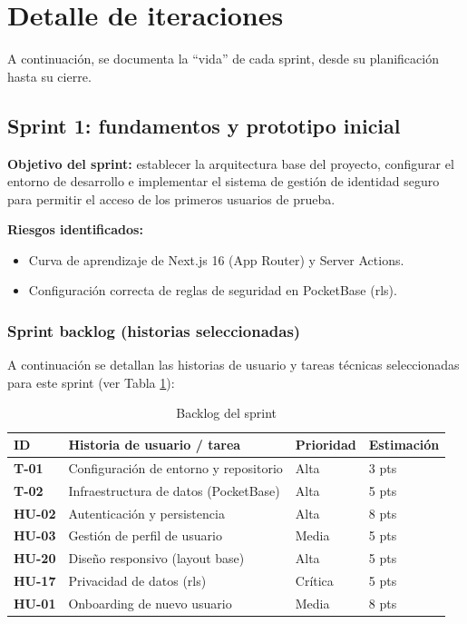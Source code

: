\section{Detalle de iteraciones}

A continuación, se documenta la \enquote{vida} de cada sprint, desde su planificación hasta su cierre.

\subsection{Sprint 1: fundamentos y prototipo inicial}

\textbf{Objetivo del sprint:} establecer la arquitectura base del proyecto, configurar el entorno de desarrollo e implementar el sistema de gestión de identidad seguro para permitir el acceso de los primeros usuarios de prueba.

\textbf{Riesgos identificados:}
\begin{itemize}
\item Curva de aprendizaje de Next.js 16 (App Router) y Server Actions.
\item Configuración correcta de reglas de seguridad en PocketBase (\gls{rls}).
\end{itemize}

\subsubsection{Sprint backlog (historias seleccionadas)}

A continuación se detallan las historias de usuario y tareas técnicas seleccionadas para este sprint (ver Tabla \ref{tab:backlog_sprint1}):

\begin{table}[h]
\centering
\begin{tabularx}{0.95\textwidth}{|l|X|l|l|}
\hline
\textbf{ID} & \textbf{Historia de usuario / tarea} & \textbf{Prioridad} & \textbf{Estimación} \\
\hline
\textbf{T-01} & Configuración de entorno y repositorio & Alta & 3 pts \\
\hline
\textbf{T-02} & Infraestructura de datos (PocketBase) & Alta & 5 pts \\
\hline
\textbf{HU-02} & Autenticación y persistencia & Alta & 8 pts \\
\hline
\textbf{HU-03} & Gestión de perfil de usuario & Media & 5 pts \\
\hline
\textbf{HU-20} & Diseño responsivo (layout base) & Alta & 5 pts \\
\hline
\textbf{HU-17} & Privacidad de datos (\gls{rls}) & Crítica & 5 pts \\
\hline
\textbf{HU-01} & Onboarding de nuevo usuario & Media & 8 pts \\
\hline
\end{tabularx}
\caption{Backlog del sprint}
\label{tab:backlog_sprint1}
\end{table}

